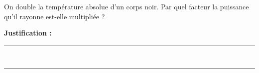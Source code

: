 On double la température absolue d'un corps noir. Par quel facteur la puissance qu'il rayonne est-elle multipliée ?

\choices

\noindent\textbf{Justification :} \hrulefill \\[2.5ex]
\rule{\linewidth}{0.4pt} \\[2.5ex]
\rule{\linewidth}{0.4pt}
\vfill
